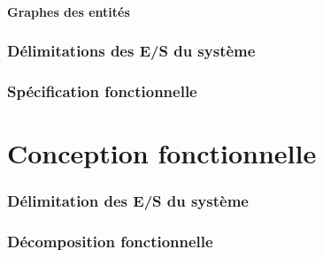 \documentclass[11pt, french]{article} %
\begin{document}
\subsection{Graphes des entités}

\section{Délimitations des E/S du système}

\section{Spécification fonctionnelle}



\part{Conception fonctionnelle}
\section{Délimitation des E/S du système}
\section{Décomposition fonctionnelle}

%






\end{document}
